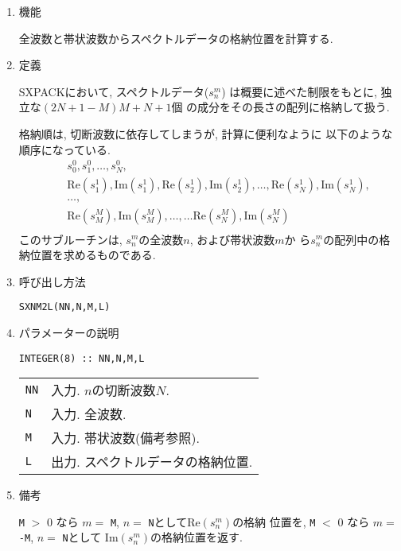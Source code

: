 \documentclass[a4j]{jsarticle}
\begin{document}
\begin{enumerate}

\item 機能 

全波数と帯状波数からスペクトルデータの格納位置を計算する.

\item 定義

SXPACKにおいて, スペクトルデータ($s^m_n$)
は概要に述べた制限をもとに, 独立な$(2N+1-M)M+N+1$個
の成分をその長さの配列に格納して扱う.

格納順は, 切断波数に依存してしまうが, 計算に便利なように
以下のような順序になっている.
\begin{eqnarray*}
&& s^0_0, s^0_1, \ldots, s^0_N,\\
&& \mbox{Re}(s^1_1), \mbox{Im}(s^1_1),
\mbox{Re}(s^1_2), \mbox{Im}(s^1_2), \ldots, 
\mbox{Re}(s^1_N), \mbox{Im}(s^1_N),\\
&&\ldots,\\
&& \mbox{Re}(s^M_M), \mbox{Im}(s^M_M), \ldots,
\ldots \mbox{Re}(s^M_N), \mbox{Im}(s^M_N)\\
\end{eqnarray*}
このサブルーチンは, $s^m_n$の全波数$n$, および帯状波数$m$か
ら$s^m_n$の配列中の格納位置を求めるものである.

\item 呼び出し方法 
    
\texttt{SXNM2L(NN,N,M,L)}
  
\item パラメーターの説明

\begin{verbatim}
INTEGER(8) :: NN,N,M,L  
\end{verbatim}    

\begin{tabular}{ll}
\texttt{NN} & 入力. $n$の切断波数$N$.\\
\texttt{N} & 入力. 全波数.\\
\texttt{M} & 入力. 帯状波数(備考参照).\\
\texttt{L} & 出力. スペクトルデータの格納位置.
\end{tabular}

\item 備考

\texttt{M} $>$ 0 なら $m=$ \texttt{M}, $n=$ \texttt{N}として$\mbox{Re}(s^m_n)$の格納
位置を, \texttt{M} $<$ 0 なら $m=$ \texttt{-M}, $n=$ \texttt{N}として
$\mbox{Im}(s^m_n)$の格納位置を返す.

\end{enumerate}
\end{document}

